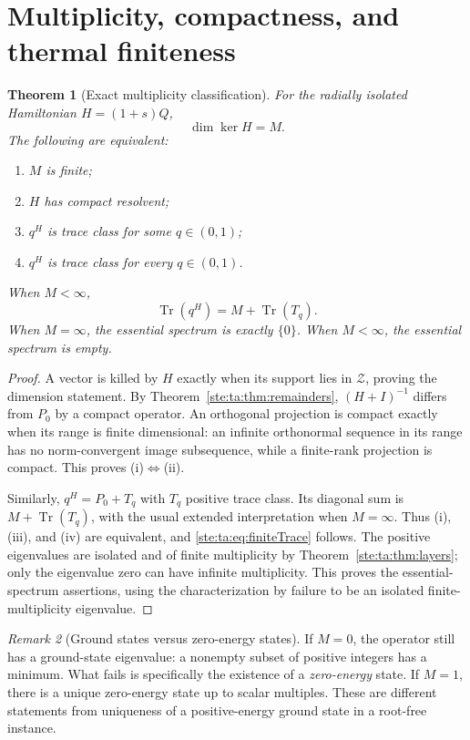 \documentclass[11pt,letterpaper]{article}
\newtheorem{theorem}{Theorem}[section]
\theoremstyle{definition}
\theoremstyle{remark}
\newtheorem{remark}[theorem]{Remark}
\DeclareMathOperator{\Tr}{Tr}
\begin{document}
\section{Multiplicity, compactness, and thermal finiteness}
\begin{theorem}[Exact multiplicity classification]\label{ste:ta:thm:classification}
For the radially isolated Hamiltonian $H=(1+s)Q$,
\[
\dim\ker H=M.
\]
The following are equivalent:
\begin{enumerate}[label=(\roman*),itemsep=1pt]
\item $M$ is finite;
\item $H$ has compact resolvent;
\item $q^H$ is trace class for some $q\in(0,1)$;
\item $q^H$ is trace class for every $q\in(0,1)$.
\end{enumerate}
When $M<\infty$,
\begin{equation}\label{ste:ta:eq:finiteTrace}
\Tr(q^H)=M+\Tr(T_q).
\end{equation}
When $M=\infty$, the essential spectrum is exactly $\{0\}$. When $M<\infty$, the essential spectrum is empty.
\end{theorem}
\begin{proof}
A vector is killed by $H$ exactly when its support lies in $\mathcal Z$, proving the dimension statement. By Theorem~\ref{ste:ta:thm:remainders}, $(H+I)^{-1}$ differs from $P_0$ by a compact operator. An orthogonal projection is compact exactly when its range is finite dimensional: an infinite orthonormal sequence in its range has no norm-convergent image subsequence, while a finite-rank projection is compact. This proves (i)$\Leftrightarrow$(ii).

Similarly, $q^H=P_0+T_q$ with $T_q$ positive trace class. Its diagonal sum is $M+\Tr(T_q)$, with the usual extended interpretation when $M=\infty$. Thus (i), (iii), and (iv) are equivalent, and \eqref{ste:ta:eq:finiteTrace} follows. The positive eigenvalues are isolated and of finite multiplicity by Theorem~\ref{ste:ta:thm:layers}; only the eigenvalue zero can have infinite multiplicity. This proves the essential-spectrum assertions, using the characterization by failure to be an isolated finite-multiplicity eigenvalue.
\end{proof}

\begin{remark}[Ground states versus zero-energy states]
If $M=0$, the operator still has a ground-state eigenvalue: a nonempty subset of positive integers has a minimum. What fails is specifically the existence of a \emph{zero-energy} state. If $M=1$, there is a unique zero-energy state up to scalar multiples. These are different statements from uniqueness of a positive-energy ground state in a root-free instance.
\end{remark}
\end{document}
